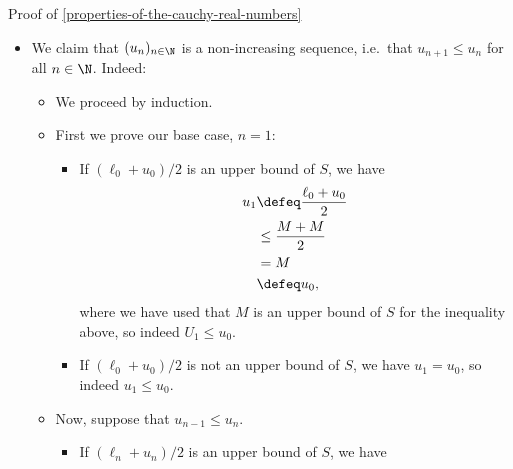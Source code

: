 \begin{Proof}{Proof of \cref{properties-of-the-cauchy-real-numbers}}
\begin{itemize}
\begin{itemize}
\begin{itemize}
                        \item If $(\ell_{n}+u_{n})/2$ is not an upper bound of $S$, we have
                            \begin{align*}
                                \ell_{n} &=      \frac{\ell_{n}+\ell_{n}}{2}\\
                                         &\leq   \frac{\ell_{n}+u_{n}}{2}\\
                                         &\defeq \ell_{n+1},
                            \end{align*}
                            where we have used that $\ell_{n}\leq u_{n}$ for each $n\in\N$.
                    \end{itemize}
            \end{itemize}
        \item We claim that $(u_{n})_{n\in\N}$ is a non-increasing sequence, i.e.\ that $u_{n+1}\leq u_{n}$ for all $n\in\N$. Indeed:
            \begin{itemize}
                \item We proceed by induction.
                \item First we prove our base case, $n=1$:
                    \begin{itemize}
                        \item If $(\ell_{0}+u_{0})/2$ is an upper bound of $S$, we have
                            \begin{align*}
                                u_{1} &\defeq \frac{\ell_{0}+u_{0}}{2}\\
                                      &\leq   \frac{M+M}{2}\\
                                      &=      M\\
                                      &\defeq u_{0},
                            \end{align*}
                            where we have used that $M$ is an upper bound of $S$ for the inequality above, so indeed $U_{1}\leq u_{0}$.
                        \item If $(\ell_{0}+u_{0})/2$ is not an upper bound of $S$, we have $u_{1}=u_{0}$, so indeed $u_{1}\leq u_{0}$.
                    \end{itemize}
                \item Now, suppose that $u_{n-1}\leq u_{n}$.
                    \begin{itemize}
                        \item If $(\ell_{n}+u_{n})/2$ is an upper bound of $S$, we have

\end{itemize}
\end{itemize}
\end{itemize}
\end{Proof}
